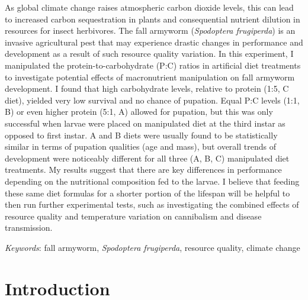 \documentclass[12pt,]{article}
\renewenvironment{abstract}
 {{%
    \setlength{\leftmargin}{0mm}
    \setlength{\rightmargin}{\leftmargin}%
  }%
  \relax}
 {\endlist}
\begin{document}
\begin{abstract}

    \hbox{\vrule height .2pt width 39.14pc}

    \vskip 8.5pt %

\noindent As global climate change raises atmospheric carbon dioxide
levels, this can lead to increased carbon sequestration in plants and
consequential nutrient dilution in resources for insect herbivores. The
fall armyworm (\emph{Spodoptera frugiperda}) is an invasive agricultural
pest that may experience drastic changes in performance and development
as a result of such resource quality variation. In this experiment, I
manipulated the protein-to-carbohydrate (P:C) ratios in artificial diet
treatments to investigate potential effects of macronutrient
manipulation on fall armyworm development. I found that high
carbohydrate levels, relative to protein (1:5, C diet), yielded very low
survival and no chance of pupation. Equal P:C levels (1:1, B) or even
higher protein (5:1, A) allowed for pupation, but this was only
successful when larvae were placed on manipulated diet at the third
instar as opposed to first instar. A and B diets were usually found to
be statistically similar in terms of pupation qualities (age and mass),
but overall trends of development were noticeably different for all
three (A, B, C) manipulated diet treatments. My results suggest that
there are key differences in performance depending on the nutritional
composition fed to the larvae. I believe that feeding these same diet
formulas for a shorter portion of the lifespan will be helpful to then
run further experimental tests, such as investigating the combined
effects of resource quality and temperature variation on cannibalism and
disease transmission.


\vskip 8.5pt \noindent \emph{Keywords}: fall armyworm, \emph{Spodoptera
frugiperda}, resource quality, climate change \par

    \hbox{\vrule height .2pt width 39.14pc}



\end{abstract}


\vskip -8.5pt



\noindent  

\hypertarget{introduction}{%
\section{Introduction}\label{introduction}}
\end{document}
